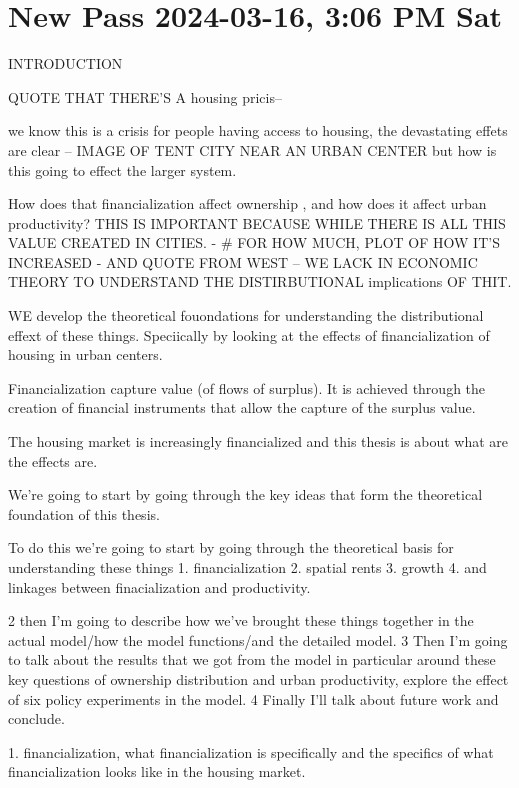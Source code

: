 \section{New Pass 2024-03-16, 3:06 PM Sat}

INTRODUCTION

QUOTE THAT THERE'S A housing pricis--

we know this is a crisis for people having access to housing, the devastating effets are clear -- IMAGE OF TENT CITY NEAR AN URBAN CENTER
but how is this going to effect the larger system.


How does that financialization affect ownership , and how does it affect urban productivity?
THIS IS IMPORTANT BECAUSE WHILE THERE IS ALL THIS VALUE CREATED IN CITIES. - # FOR HOW MUCH, PLOT OF HOW IT'S INCREASED - AND QUOTE FROM WEST -- WE LACK IN ECONOMIC THEORY TO UNDERSTAND THE DISTIRBUTIONAL implications OF THIT.


WE develop the theoretical fouondations for understanding the distributional effext of these things. Speciically by looking at the effects of financialization of housing in urban centers. 

Financialization capture value (of flows of surplus). It is achieved through the creation of financial instruments that allow the capture of the surplus value. 

The housing market is increasingly financialized and this thesis is about what are the effects are. 


We’re going to start by going through the key ideas that form the theoretical foundation of this thesis.


To do this we’re going to start by going through the theoretical basis for understanding these things
1. financialization
2. spatial rents
3. growth
4. and linkages between finacialization and productivity.
 
 2 then I'm going to describe how we've brought these things together in the actual model/how the model functions/and the detailed model.
 3 Then I'm going to talk about the results that we got from the model in particular around these key questions of ownership distribution and urban productivity, explore the effect of six policy experiments in the model. 
 4 Finally I'll talk about future work and conclude.



1. financialization, what financialization is  specifically  and  the specifics of what financialization looks like in the housing market.

